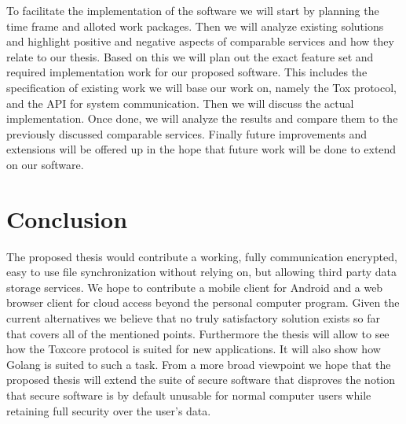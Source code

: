 \documentclass[a4paper,10pt,twoside]{article}
\begin{document}
To facilitate the implementation of the software we will start by planning the time frame and alloted work packages.
Then we will analyze existing solutions and highlight positive and negative aspects of comparable services and how they relate to our thesis.
Based on this we will plan out the exact feature set and required implementation work for our proposed software.
This includes the specification of existing work we will base our work on, namely the Tox protocol, and the API for system communication.
Then we will discuss the actual implementation.
Once done, we will analyze the results and compare them to the previously discussed comparable services.
Finally future improvements and extensions will be offered up in the hope that future work will be done to extend on our software.

\section{Conclusion}

The proposed thesis would contribute a working, fully communication encrypted, easy to use file synchronization without relying on, but allowing third party data storage services.
We hope to contribute a mobile client for Android and a web browser client for cloud access beyond the personal computer program.
Given the current alternatives we believe that no truly satisfactory solution exists so far that covers all of the mentioned points.
Furthermore the thesis will allow to see how the Toxcore protocol is suited for new applications.
It will also show how Golang is suited to such a task.
From a more broad viewpoint we hope that the proposed thesis will extend the suite of secure software that disproves the notion that secure software is by default unusable for normal computer users while retaining full security over the user's data.

{\small %

}
\end{document}
